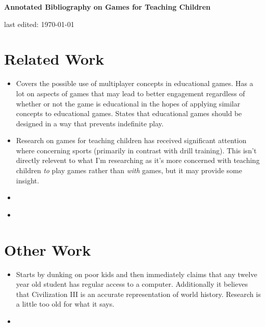 \documentclass[12pt]{article}
\begin{document}
\begin{center}
   {\Large\textbf{Annotated Bibliography on Games for Teaching Children}}
\medskip

   { last edited: \today
   }
\end{center}

\section{Related Work} 

\begin{itemize}
\item\cite{paraskeva2010multiplayer} Covers the possible use of multiplayer concepts in educational games. Has a lot on aspects of games that may lead to better engagement regardless of whether or not the game is educational in the hopes of applying similar concepts to educational games. States that educational games should be designed in a way that prevents indefinite play.

\item\cite{holt2002expanding} Research on games for teaching children has received significant attention where concerning sports (primarily in contrast with drill training). This isn't directly relevent to what I'm researching as it's more concerned with teaching children \emph{to} play games rather than \emph{with} games, but it may provide some insight.

\item\cite{berns2021virtualreality}

\item\cite{dasilveira2021eguess}
\end{itemize}


\section{Other Work}

\begin{itemize}
\item\cite{squire2008designing} Starts by dunking on poor kids and then immediately claims that any twelve year old student has regular access to a computer. Additionally it believes that Civilization III is an accurate representation of world history. Research is a little too old for what it says.

\item\cite{lopez2021robotics}
\end{itemize}

\nocite{*}



\end{document}
